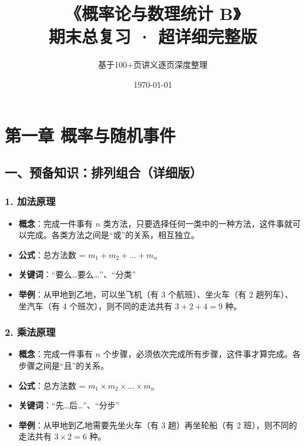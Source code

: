 \documentclass[12pt,a4paper]{ctexart}
\title{\Huge \textbf{《概率论与数理统计 B》} \\ \Large 期末总复习 · 超详细完整版}
\author{基于100+页讲义逐页深度整理}
\date{\today}
\begin{document}
\maketitle
\tableofcontents
\newpage

\section{第一章 概率与随机事件}

\subsection{一、预备知识：排列组合（详细版）}

\subsubsection{1. 加法原理}
\begin{itemize}[noitemsep]
    \item \textbf{概念}：完成一件事有 $n$ 类方法，只要选择任何一类中的一种方法，这件事就可以完成。各类方法之间是“或”的关系，相互独立。
    \item \textbf{公式}：总方法数 = $m_1 + m_2 + \dots + m_n$
    \item \textbf{关键词}：“要么…要么…”、“分类”
    \item \textbf{举例}：从甲地到乙地，可以坐飞机（有 3 个航班）、坐火车（有 2 趟列车）、坐汽车（有 4 个班次），则不同的走法共有 $3+2+4=9$ 种。
\end{itemize}

\subsubsection{2. 乘法原理}
\begin{itemize}[noitemsep]
    \item \textbf{概念}：完成一件事有 $n$ 个步骤，必须依次完成所有步骤，这件事才算完成。各步骤之间是“且”的关系。
    \item \textbf{公式}：总方法数 = $m_1 \times m_2 \times \dots \times m_n$
    \item \textbf{关键词}：“先…后…”、“分步”
    \item \textbf{举例}：从甲地到乙地需要先坐火车（有 3 趟）再坐轮船（有 2 班），则不同的走法共有 $3 \times 2 = 6$ 种。
\end{itemize}
\end{document}
